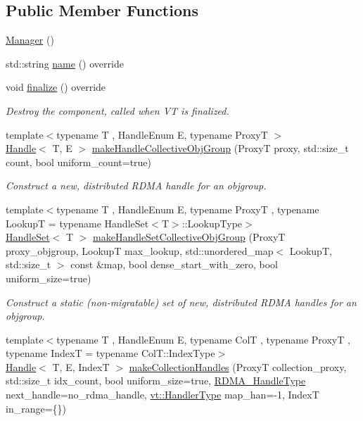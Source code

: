 \subsection*{Public Member Functions}
\begin{DoxyCompactItemize}
\item 
\hyperlink{structvt_1_1rdma_1_1_manager_aa5d34a3c5fa988278255562eea5f8aca}{Manager} ()
\item 
std\+::string \hyperlink{structvt_1_1rdma_1_1_manager_aa649646fe571ac8100a39737ac413a8d}{name} () override
\item 
void \hyperlink{structvt_1_1rdma_1_1_manager_ad4ff20cf1ba6e870326b20900e6eb581}{finalize} () override
\begin{DoxyCompactList}\small\item\em Destroy the component, called when VT is finalized. \end{DoxyCompactList}\item 
{\footnotesize template$<$typename T , Handle\+Enum E, typename ProxyT $>$ }\\\hyperlink{structvt_1_1rdma_1_1_handle}{Handle}$<$ T, E $>$ \hyperlink{structvt_1_1rdma_1_1_manager_a1aea03b0c098e22cedc08159a64dbd7c}{make\+Handle\+Collective\+Obj\+Group} (ProxyT proxy, std\+::size\+\_\+t count, bool uniform\+\_\+count=true)
\begin{DoxyCompactList}\small\item\em Construct a new, distributed R\+D\+MA handle for an objgroup. \end{DoxyCompactList}\item 
{\footnotesize template$<$typename T , Handle\+Enum E, typename ProxyT , typename LookupT  = typename Handle\+Set$<$\+T$>$\+::\+Lookup\+Type$>$ }\\\hyperlink{structvt_1_1rdma_1_1_handle_set}{Handle\+Set}$<$ T $>$ \hyperlink{structvt_1_1rdma_1_1_manager_aa86a5f0d86cd0e721f863a68fbe66a35}{make\+Handle\+Set\+Collective\+Obj\+Group} (ProxyT proxy\+\_\+objgroup, LookupT max\+\_\+lookup, std\+::unordered\+\_\+map$<$ LookupT, std\+::size\+\_\+t $>$ const \&map, bool dense\+\_\+start\+\_\+with\+\_\+zero, bool uniform\+\_\+size=true)
\begin{DoxyCompactList}\small\item\em Construct a static (non-\/migratable) set of new, distributed R\+D\+MA handles for an objgroup. \end{DoxyCompactList}\item 
{\footnotesize template$<$typename T , Handle\+Enum E, typename ColT , typename ProxyT , typename IndexT  = typename Col\+T\+::\+Index\+Type$>$ }\\\hyperlink{structvt_1_1rdma_1_1_handle}{Handle}$<$ T, E, IndexT $>$ \hyperlink{structvt_1_1rdma_1_1_manager_aad62be5c2cb0225139cf3d665b5fd7f2}{make\+Collection\+Handles} (ProxyT collection\+\_\+proxy, std\+::size\+\_\+t idx\+\_\+count, bool uniform\+\_\+size=true, \hyperlink{namespacevt_a10442579ec4e7ebef223818e64bcf908}{R\+D\+M\+A\+\_\+\+Handle\+Type} next\+\_\+handle=no\+\_\+rdma\+\_\+handle, \hyperlink{namespacevt_af64846b57dfcaf104da3ef6967917573}{vt\+::\+Handler\+Type} map\+\_\+han=-\/1, IndexT in\+\_\+range=\{\})

\end{DoxyCompactItemize}
